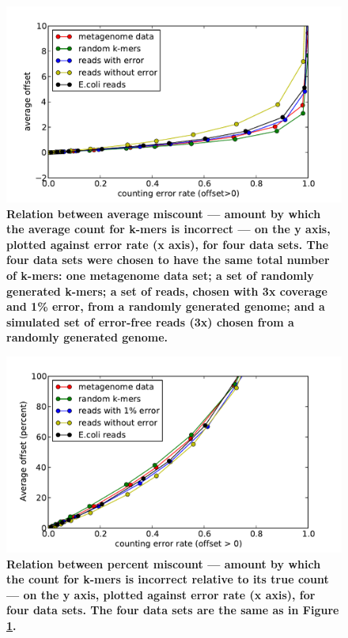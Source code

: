 \documentclass[10pt]{article}
\begin{document}
\begin{figure}[!ht]
\centerline{\includegraphics[width=5in]{./figure/average_offset_vs_fpr}}
\caption{\bf Relation between average miscount --- amount by which
the average count for k-mers is incorrect --- on the y axis, plotted against
error rate (x axis), for four data sets.  The four data
sets were chosen to have the same total number of k-mers: one
metagenome data set; a set of randomly generated k-mers; a set
of reads, chosen with 3x coverage and 1\% error, from a randomly generated
genome; and a simulated set of error-free reads (3x) chosen from a randomly
generated genome.}
\label{fig:average_offset_vs_fpr}
\end{figure}

\begin{figure}[!ht]
\centerline{\includegraphics[width=5in]{./figure/percent_offset_vs_fpr}}
\caption{\bf Relation between percent miscount --- amount by which
the count for k-mers is incorrect relative to its true count --- on the y axis, plotted 
against
error rate (x axis), for four data sets.  The four data
sets are the same as in Figure \ref{fig:average_offset_vs_fpr}.}
\label{fig:percent_offset_vs_fpr}
\end{figure}
\end{document}
